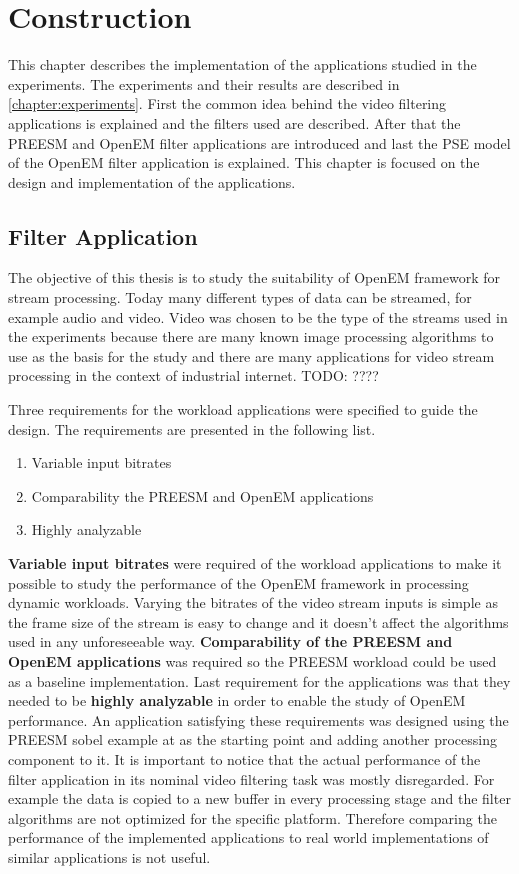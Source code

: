 \chapter{Construction}
\label{chapter:construction}
This chapter describes the implementation of the applications studied in the
experiments. The experiments and their results are described in
\ref{chapter:experiments}. First the common idea behind the video filtering
applications is explained and the filters used are described. After that the
PREESM and OpenEM filter applications are introduced and last the PSE model of
the OpenEM filter application is explained. This chapter is focused on the
design and implementation of the applications.

\section{Filter Application}
\label{sec:filterapp}
The objective of this thesis is to study the suitability of OpenEM framework
for stream processing. Today many different types of data can be streamed, for
example audio and video. Video was chosen to be the type of the streams used in
the experiments because there are many known image processing algorithms to use
as the basis for the study and there are many applications for video stream
processing in the context of industrial internet. TODO: ????

Three requirements for the workload applications were specified to guide the
design. The requirements are presented in the following list.

\begin{enumerate}
    \item{Variable input bitrates}
    \item{Comparability the PREESM and OpenEM applications}
    \item{Highly analyzable}
\end{enumerate}

\textbf{Variable input bitrates} were required of the workload applications to
make it possible to study the performance of the OpenEM framework in processing
dynamic workloads. Varying the bitrates of the video stream inputs is simple as
the frame size of the stream is easy to change and it doesn't affect the
algorithms used in any unforeseeable way. \textbf{Comparability of the PREESM
and OpenEM applications} was required so the PREESM workload could be used as a
baseline implementation. Last requirement for the applications was that they
needed to be \textbf{highly analyzable} in order to enable the study of OpenEM
performance. An application satisfying these requirements was designed using the
PREESM sobel example at \cite{preesmtut} as the starting point and adding
another processing component to it. It is important to notice that the actual
performance of the filter application in its nominal video filtering task was
mostly disregarded. For example the data is copied to a new buffer in every
processing stage and the filter algorithms are not optimized for the specific
platform. Therefore comparing the performance of the implemented applications to
real world implementations of similar applications is not useful.

